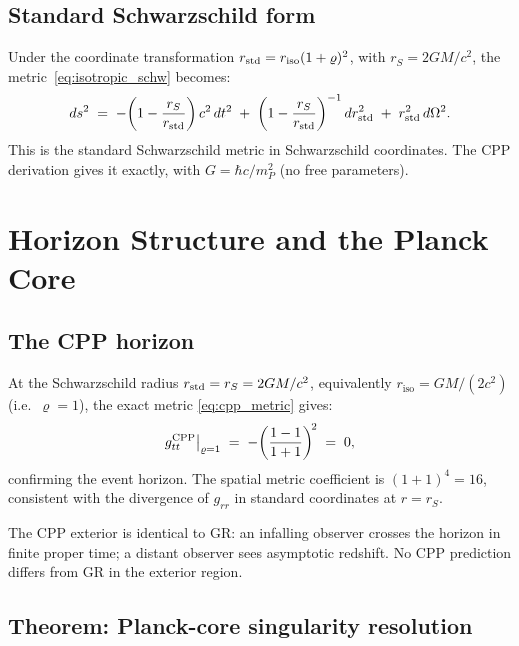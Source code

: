 \documentclass[12pt]{article}
\newcommand{\mP}{m_P}
\newcommand{\riso}{r_{\mathrm{iso}}}
\newcommand{\vrho}{\varrho}   %
\begin{document}
\subsection{Standard Schwarzschild form}
\label{subsec:standard}

Under the coordinate transformation $r_{\rm std} = \riso(1+\vrho)^2$,
with $r_S = 2GM/c^2$, the metric~\eqref{eq:isotropic_schw} becomes:
\begin{equation}
  ds^2 \;=\; -\!\left(1 - \frac{r_S}{r_{\rm std}}\right)c^2\,dt^2
  \;+\; \left(1 - \frac{r_S}{r_{\rm std}}\right)^{-1}dr_{\rm std}^2
  \;+\; r_{\rm std}^2\,d\Omega^2.
  \label{eq:standard_schw}
\end{equation}
This is the standard Schwarzschild metric in Schwarzschild coordinates.
The CPP derivation gives it exactly, with $G = \hbar c/\mP^2$ (no free
parameters).

\section{Horizon Structure and the Planck Core}
\label{sec:core}

\subsection{The CPP horizon}
\label{subsec:horizon}

At the Schwarzschild radius $r_{\rm std} = r_S = 2GM/c^2$, equivalently
$\riso = GM/(2c^2)$ (i.e.\ $\vrho = 1$), the exact metric
\eqref{eq:cpp_metric} gives:
\begin{equation}
  g_{tt}^{\rm CPP}\big|_{\vrho=1}
  \;=\; -\!\left(\frac{1-1}{1+1}\right)^{\!2} \;=\; 0,
  \label{eq:horizon}
\end{equation}
confirming the event horizon.  The spatial metric coefficient is
$(1+1)^4 = 16$, consistent with the divergence of $g_{rr}$ in
standard coordinates at $r = r_S$.

The CPP exterior is identical to GR: an infalling observer crosses the
horizon in finite proper time; a distant observer sees asymptotic
redshift.  No CPP prediction differs from GR in the exterior region.

\subsection{Theorem: Planck-core singularity resolution}
\label{subsec:thm_core}
\end{document}
